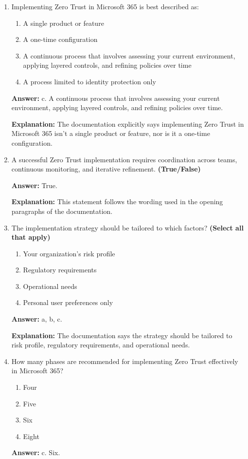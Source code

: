 \documentclass[10pt]{article}
\begin{document}
\begin{enumerate}[leftmargin=*]

\item Implementing Zero Trust in Microsoft 365 is best described as:
\begin{enumerate}[label=\alph*., leftmargin=1.5em]
\item A single product or feature
\item A one-time configuration
\item A continuous process that involves assessing your current environment, applying layered controls, and refining policies over time
\item A process limited to identity protection only
\end{enumerate}
\textbf{Answer:} c. A continuous process that involves assessing your current environment, applying layered controls, and refining policies over time.

\textbf{Explanation:} The documentation explicitly says implementing Zero Trust in Microsoft 365 isn't a single product or feature, nor is it a one-time configuration.

\item A successful Zero Trust implementation requires coordination across teams, continuous monitoring, and iterative refinement. \textbf{(True/False)}

\textbf{Answer:} True.

\textbf{Explanation:} This statement follows the wording used in the opening paragraphs of the documentation.

\item The implementation strategy should be tailored to which factors? \textbf{(Select all that apply)}
\begin{enumerate}[label=\alph*., leftmargin=1.5em]
\item Your organization’s risk profile
\item Regulatory requirements
\item Operational needs
\item Personal user preferences only
\end{enumerate}
\textbf{Answer:} a, b, c.

\textbf{Explanation:} The documentation says the strategy should be tailored to risk profile, regulatory requirements, and operational needs.

\item How many phases are recommended for implementing Zero Trust effectively in Microsoft 365?
\begin{enumerate}[label=\alph*., leftmargin=1.5em]
\item Four
\item Five
\item Six
\item Eight
\end{enumerate}
\textbf{Answer:} c. Six.


\end{enumerate}
\end{document}
